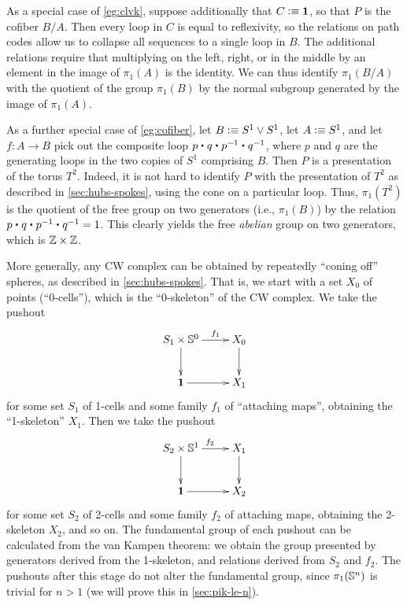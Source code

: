 \begin{eg}\label{eg:cofiber}
  As a special case of \autoref{eg:clvk}, suppose additionally that $C\vcentcolon\equiv\mathbf{1}$, so that $P$ is the cofiber $B/A$.
  Then every loop in $C$ is equal to reflexivity, so the relations on path codes allow us to collapse all sequences to a single loop in $B$.
  The additional relations require that multiplying on the left, right, or in the middle by an element in the image of $\pi_1(A)$ is the identity.
  We can thus identify $\pi_1(B/A)$ with the quotient of the group $\pi_1(B)$ by the normal subgroup generated by the image of $\pi_1(A)$.
\end{eg}

\begin{eg}\label{eg:torus}
  As a further special case of \autoref{eg:cofiber}, let $B\vcentcolon\equiv S^1 \vee S^1$, let $A\vcentcolon\equiv S^1$, and let $f:A\to B$ pick out the composite loop $p \ct q \ct \opp p \ct \opp q$, where $p$ and $q$ are the generating loops in the two copies of $S^1$ comprising $B$.
  Then $P$ is a presentation of the torus $T^2$.
  Indeed, it is not hard to identify $P$ with the presentation of $T^2$ as described in \autoref{sec:hubs-spokes}, using the cone on a particular loop.
  Thus, $\pi_1(T^2)$ is the quotient of the free group on two generators (i.e., $\pi_1(B)$) by the relation $p \ct q \ct \opp p \ct \opp q = 1$.
  This clearly yields the free \emph{abelian} group on two generators, which is $\mathbb{Z}\times\mathbb{Z}$.
\end{eg}

\begin{eg}
  More generally, any CW complex can be obtained by repeatedly ``coning off'' spheres, as described in \autoref{sec:hubs-spokes}.
  That is, we start with a set $X_0$ of points (``0-cells''), which is the ``0-skeleton'' of the CW complex.
  We take the pushout
  \begin{equation*}
    \vcenter{\xymatrix{
        S_1 \times \Sn^0\ar[r]^-{f_1}\ar[d] &
        X_0\ar[d]\\
        \unit \ar[r] &
        X_1
      }}
  \end{equation*}
  for some set $S_1$ of 1-cells and some family $f_1$ of ``attaching maps'', obtaining the ``1-skeleton'' $X_1$.
  Then we take the pushout
  \begin{equation*}
    \vcenter{\xymatrix{
        S_2 \times \Sn^1\ar[r]^{f_2}\ar[d] &
        X_1\ar[d]\\
        \unit \ar[r] &
        X_2
      }}
  \end{equation*}
  for some set $S_2$ of 2-cells and some family $f_2$ of attaching maps, obtaining the 2-skeleton $X_2$, and so on.
  The fundamental group of each pushout can be calculated from the van Kampen theorem: we obtain the group presented by generators derived from the 1-skeleton, and relations derived from $S_2$ and $f_2$.
  The pushouts after this stage do not alter the fundamental group, since $\pi_1(\mathbb{S}^n)$ is trivial for $n>1$ (we will prove this in \autoref{sec:pik-le-n}).
\end{eg}

